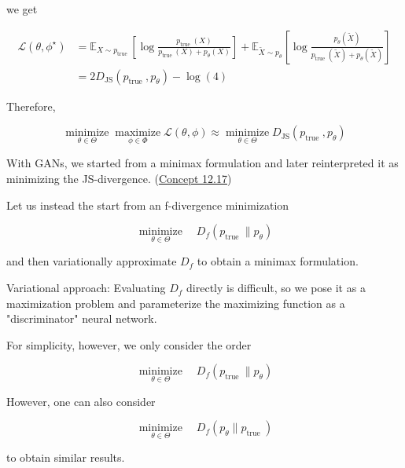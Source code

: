 \documentclass{report}
\begin{document}
\begin{concept}
    we get

    $$
    \begin{aligned}
    \mathcal{L}\left(\theta, \phi^{\star}\right) & =\mathbb{E}_{X \sim p_{\text {true }}}\left[\log \frac{p_{\text {true }}(X)}{p_{\text {true }}(X)+p_{\theta}(X)}\right]+\mathbb{E}_{\tilde{X} \sim p_{\theta}}\left[\log \frac{p_{\theta}(\tilde{X})}{p_{\text {true }}(\tilde{X})+p_{\theta}(\tilde{X})}\right] \\
    & =2 D_{\mathrm{JS}}\left(p_{\text {true }}, p_{\theta}\right)-\log (4)
    \end{aligned}
    $$

    Therefore,

    $$
    \underset{\theta \in \Theta}{\operatorname{minimize}} \underset{\phi \in \Phi}{\operatorname{maximize}} \mathcal{L}(\theta, \phi) \approx \underset{\theta \in \Theta}{\operatorname{minimize}} D_{\mathrm{JS}}\left(p_{\text {true }}, p_{\theta}\right)
    $$
\end{concept}

\par\noindent\textcolor{gray}{\hdashrule{\textwidth}{0.4pt}{1pt 2pt}}

\begin{concept}
    With GANs, we started from a minimax formulation and later reinterpreted it as minimizing the JS-divergence. (\hyperref[concept:12.17]{Concept 12.17})

    Let us instead the start from an f-divergence minimization

    $$
    \underset{\theta \in \Theta}{\operatorname{minimize}} \quad D_{f}\left(p_{\text {true }} \| p_{\theta}\right)
    $$

    and then variationally approximate $D_{f}$ to obtain a minimax formulation.

    Variational approach: Evaluating $D_{f}$ directly is difficult, so we pose it as a maximization problem and parameterize the maximizing function as a "discriminator" neural network.

    \par\noindent\textcolor{gray}{\hdashrule{\textwidth}{0.4pt}{1pt 2pt}}

    For simplicity, however, we only consider the order

    $$
    \underset{\theta \in \Theta}{\operatorname{minimize}} \quad D_{f}\left(p_{\text {true }} \| p_{\theta}\right)
    $$

    However, one can also consider

    $$
    \underset{\theta \in \Theta}{\operatorname{minimize}} \quad D_{f}\left(p_{\theta} \| p_{\text {true }}\right)
    $$

    to obtain similar results.
\end{concept}
\end{document}
